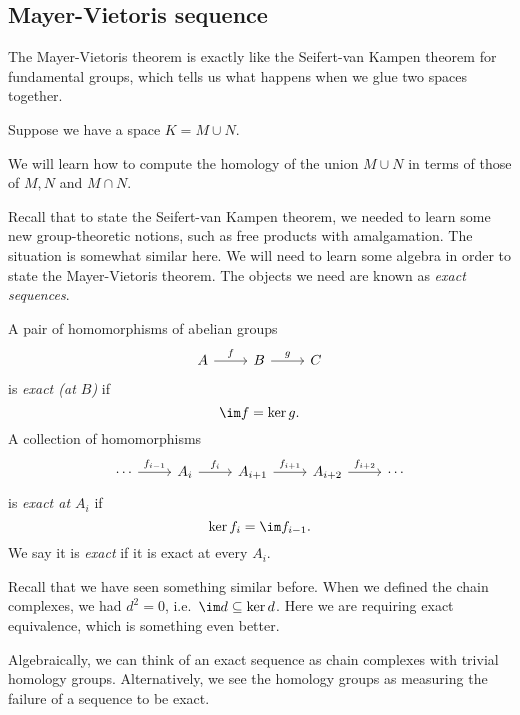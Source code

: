\documentclass[a4paper]{article}
\begin{document}
\subsection{Mayer-Vietoris sequence}
The Mayer-Vietoris theorem is exactly like the Seifert-van Kampen theorem for fundamental groups, which tells us what happens when we glue two spaces together.

Suppose we have a space $K = M\cup N$.
\begin{center}
\end{center}
We will learn how to compute the homology of the union $M\cup N$ in terms of those of $M, N$ and $M\cap N$.

Recall that to state the Seifert-van Kampen theorem, we needed to learn some new group-theoretic notions, such as free products with amalgamation. The situation is somewhat similar here. We will need to learn some algebra in order to state the Mayer-Vietoris theorem. The objects we need are known as \emph{exact sequences}.

\begin{defi}
  A pair of homomorphisms of abelian groups
  \[
    \begin{tikzcd}
      A \ar [r, "f"] & B \ar [r, "g"] & C
    \end{tikzcd}
  \]
  is \emph{exact (at $B$)} if
  \[
    \im f = \ker g.
  \]
  A collection of homomorphisms
  \[
    \begin{tikzcd}
      \cdots \ar [r, "f_{i - 1}"] & A_{i} \ar [r, "f_i"] & A_{i + 1} \ar [r, "f_{i + 1}"] & A_{i + 2} \ar[r, "f_{i + 2}"] & \cdots
    \end{tikzcd}
  \]
  is \emph{exact at $A_i$} if
  \[
    \ker f_i= \im f_{i - 1}.
  \]
  We say it is \emph{exact} if it is exact at every $A_i$.
\end{defi}
Recall that we have seen something similar before. When we defined the chain complexes, we had $d^2 = 0$, i.e.\ $\im d \subseteq \ker d$. Here we are requiring exact equivalence, which is something even better.

Algebraically, we can think of an exact sequence as chain complexes with trivial homology groups. Alternatively, we see the homology groups as measuring the failure of a sequence to be exact.
\end{document}
